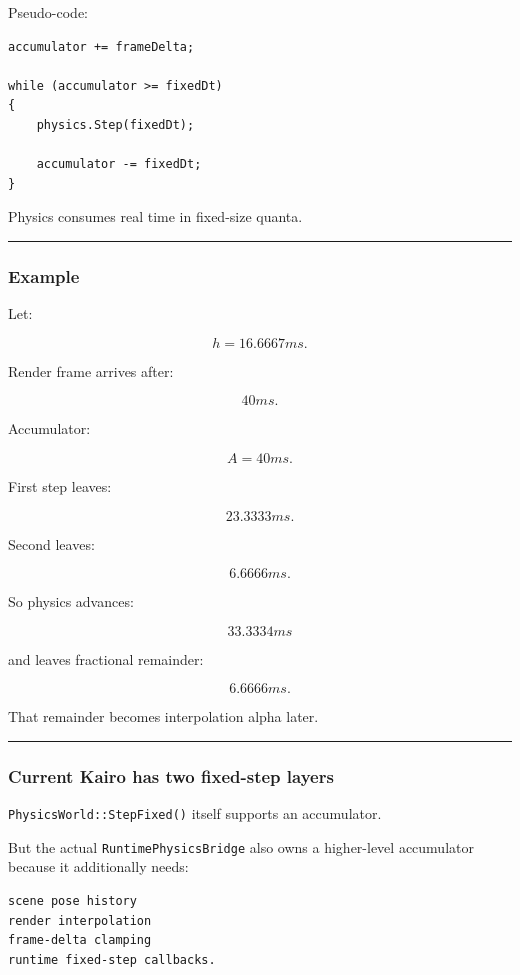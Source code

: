 Pseudo-code:

\begin{verbatim}
accumulator += frameDelta;

while (accumulator >= fixedDt)
{
    physics.Step(fixedDt);

    accumulator -= fixedDt;
}
\end{verbatim}

Physics consumes real time in fixed-size quanta.

\begin{center}\rule{0.5\linewidth}{0.5pt}\end{center}

\subsubsection{Example}\label{example}

Let:

\[
h=16.6667ms.
\]

Render frame arrives after:

\[
40ms.
\]

Accumulator:

\[
A=40ms.
\]

First step leaves:

\[
23.3333ms.
\]

Second leaves:

\[
6.6666ms.
\]

So physics advances:

\[
33.3334ms
\]

and leaves fractional remainder:

\[
6.6666ms.
\]

That remainder becomes interpolation alpha later.

\begin{center}\rule{0.5\linewidth}{0.5pt}\end{center}

\subsubsection{Current Kairo has two fixed-step layers}\label{current-kairo-has-two-fixed-step-layers}

\texttt{PhysicsWorld::StepFixed()} itself supports an accumulator.

But the actual \texttt{RuntimePhysicsBridge} also owns a higher-level accumulator because it additionally needs:

\begin{verbatim}
scene pose history
render interpolation
frame-delta clamping
runtime fixed-step callbacks.
\end{verbatim}

